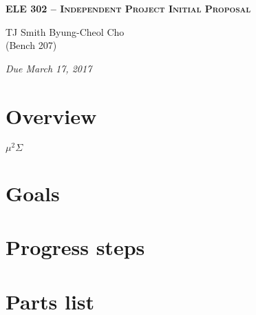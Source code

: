 \documentclass[letterpaper, 11pt]{article}
\begin{document}
    \begin{center}
        \large
        \textsc{\textbf{ELE 302 -- Independent Project Initial Proposal}} \vspace{5pt}

        \normalsize
        TJ Smith \hspace{1cm} Byung-Cheol Cho \\
        (Bench 207) \vspace{5pt}

        \emph{Due March 17, 2017}
        \normalsize
    \end{center}

\section{Overview}
$\mu^2\Sigma$

\section{Goals}

\section{Progress steps}

\section{Parts list}
\end{document}
